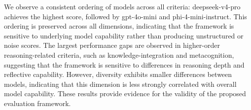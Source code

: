 We observe a consistent ordering of models across all criteria: deepseek-v4-pro achieves the highest score, followed by gpt-4o-mini and phi-4-mini-instruct.
This ordering is preserved across all dimensions, indicating that the framework is sensitive to underlying model capability rather than producing unstructured or noise scores.
The largest performance gaps are observed in higher-order reasoning-related criteria, such as knowledge-integration and metacognition, suggesting that the framework is sensitive to differences in reasoning depth and reflective capability.
However, diversity exhibits smaller differences between models, indicating that this dimension is less strongly correlated with overall model capability.
These results provide evidence for the validity of the proposed evaluation framework.